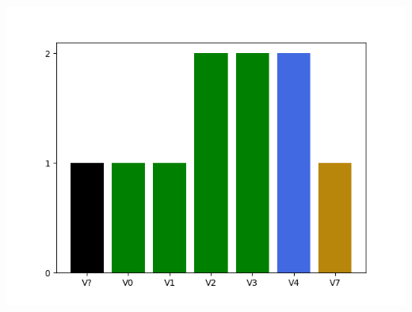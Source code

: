 































\raggedcolumns
\begin{multicols}{2}
\includegraphics[width=\linewidth]{./maps/plots//Quartzville Creek.png}
\end{multicols}
